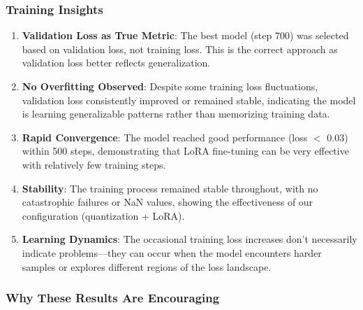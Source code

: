 \documentclass[conference]{IEEEtran}
\begin{document}
\subsubsection{Training Insights}

\begin{enumerate}
    \item \textbf{Validation Loss as True Metric}: The best model (step 700) was selected based on validation loss, not training loss. This is the correct approach as validation loss better reflects generalization.
    
    \item \textbf{No Overfitting Observed}: Despite some training loss fluctuations, validation loss consistently improved or remained stable, indicating the model is learning generalizable patterns rather than memorizing training data.
    
    \item \textbf{Rapid Convergence}: The model reached good performance (loss $<$ 0.03) within 500 steps, demonstrating that LoRA fine-tuning can be very effective with relatively few training steps.
    
    \item \textbf{Stability}: The training process remained stable throughout, with no catastrophic failures or NaN values, showing the effectiveness of our configuration (quantization + LoRA).
    
    \item \textbf{Learning Dynamics}: The occasional training loss increases don't necessarily indicate problems—they can occur when the model encounters harder samples or explores different regions of the loss landscape.
\end{enumerate}

\subsubsection{Why These Results Are Encouraging}
\end{document}
